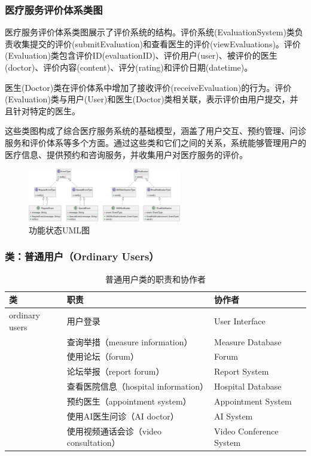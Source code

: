 \subsubsection{医疗服务评价体系类图}
医疗服务评价体系类图展示了评价系统的结构。评价系统(EvaluationSystem)类负责收集提交的评价(submitEvaluation)和查看医生的评价(viewEvaluations)。评价(Evaluation)类包含评价ID(evaluationID)、评价用户(user)、被评价的医生(doctor)、评价内容(content)、评分(rating)和评价日期(datetime)。

医生(Doctor)类在评价体系中增加了接收评价(receiveEvaluation)的行为。评价(Evaluation)类与用户(User)和医生(Doctor)类相关联，表示评价由用户提交，并且针对特定的医生。

这些类图构成了综合医疗服务系统的基础模型，涵盖了用户交互、预约管理、问诊服务和评价体系等多个方面。通过这些类和它们之间的关系，系统能够管理用户的医疗信息、提供预约和咨询服务，并收集用户对医疗服务的评价。
\begin{figure}[htbp]
	\centering
	\includegraphics[width=0.6\textwidth]{figures/07.png}
	\caption{功能状态UML图}
	\label{fig:functional_state_diagram}
\end{figure}

\subsubsection{类：普通用户（Ordinary Users）}
\begin{table}[htbp]
	\centering
	\begin{tabular}{|l|l|l|}
		\hline
		\textbf{类} & \textbf{职责} & \textbf{协作者} \\
		\hline
		ordinary users & 用户登录 & User Interface \\
		& 查询举措（measure information） & Measure Database \\
		& 使用论坛（forum） & Forum \\
		& 论坛举报（report forum） & Report System \\
		& 查看医院信息（hospital information） & Hospital Database \\
		& 预约医生（appointment system） & Appointment System \\
		& 使用AI医生问诊（AI doctor） & AI System \\
		& 使用视频通话会诊（video consultation） & Video Conference System \\
		\hline
	\end{tabular}
	\caption{普通用户类的职责和协作者}
	\label{tab:ordinary_users}
\end{table}

